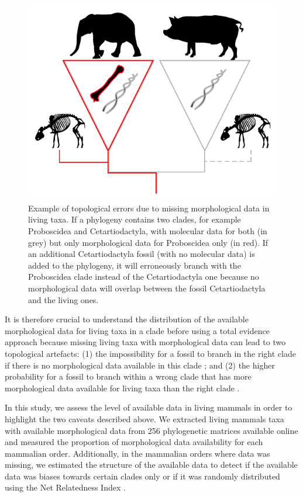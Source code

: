 \documentclass[12pt,letterpaper]{article}
\begin{document}
\begin{figure}[!htbp]
\centering
    \includegraphics[width=1\textwidth]{MissingDataFigure.pdf}
\caption{Example of topological errors due to missing morphological data in living taxa. If a phylogeny contains two clades, for example Proboscidea and Cetartiodactyla, with molecular data for both (in grey) but only morphological data for Proboscidea only (in red). If an additional Cetartiodactyla fossil (with no molecular data) is added to the phylogeny, it will erroneously branch with the Proboscidea clade instead of the Cetartiodactyla one because no morphological data will overlap between the fossil Cetartiodactyla and the living ones.}
\label{Figure_missing_data_problem}
\end{figure}

It is therefore crucial to understand the distribution of the available morphological data for living taxa in a clade before using a total evidence approach because missing living taxa with morphological data can lead to two topological artefacts: (1) the impossibility for a fossil to branch in the right clade if there is no morphological data available in this clade \cite{GuillermeCooper}; and (2) the higher probability for a fossil to branch within a wrong clade that has more morphological data available for living taxa than the right clade \cite{GuillermeCooper}.

In this study, we assess the level of available data in living mammals in order to highlight the two caveats described above.
We extracted living mammals taxa with available morphological data from 256 phylogenetic matrices available online and measured the proportion of morphological data availability for each mammalian order. Additionally, in the mammalian orders where data was missing, we estimated the structure of the available data to detect if the available data was biases towards certain clades only or if it was randomly distributed using the Net Relatedness Index \cite{webb2002phylogenies}.
\end{document}
